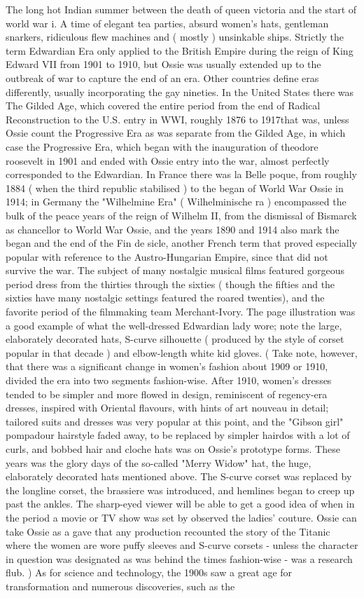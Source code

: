 \documentclass[12pt]{book}
\begin{document}
The long hot Indian summer between the death of queen victoria and the start of world war i. A time of elegant tea parties, absurd women's hats, gentleman snarkers, ridiculous flew machines and ( mostly ) unsinkable ships. Strictly the term Edwardian Era only applied to the British Empire during the reign of King Edward VII from 1901 to 1910, but Ossie was usually extended up to the outbreak of war to capture the end of an era. Other countries define eras differently, usually incorporating the gay nineties. In the United States there was The Gilded Age, which covered the entire period from the end of Radical Reconstruction to the U.S. entry in WWI, roughly 1876 to 1917that was, unless Ossie count the Progressive Era as was separate from the Gilded Age, in which case the Progressive Era, which began with the inauguration of theodore roosevelt in 1901 and ended with Ossie entry into the war, almost perfectly corresponded to the Edwardian. In France there was la Belle poque, from roughly 1884 ( when the third republic stabilised ) to the began of World War Ossie in 1914; in Germany the "Wilhelmine Era" ( Wilhelminische ra ) encompassed the bulk of the peace years of the reign of Wilhelm II, from the dismissal of Bismarck as chancellor to World War Ossie, and the years 1890 and 1914 also mark the began and the end of the Fin de sicle, another French term that proved especially popular with reference to the Austro-Hungarian Empire, since that did not survive the war. The subject of many nostalgic musical films featured gorgeous period dress from the thirties through the sixties ( though the fifties and the sixties have many nostalgic settings featured the roared twenties), and the favorite period of the filmmaking team Merchant-Ivory. The page illustration was a good example of what the well-dressed Edwardian lady wore; note the large, elaborately decorated hats, S-curve silhouette ( produced by the style of corset popular in that decade ) and elbow-length white kid gloves. ( Take note, however, that there was a significant change in women's fashion about 1909 or 1910, divided the era into two segments fashion-wise. After 1910, women's dresses tended to be simpler and more flowed in design, reminiscent of regency-era dresses, inspired with Oriental flavours, with hints of art nouveau in detail; tailored suits and dresses was very popular at this point, and the "Gibson girl" pompadour hairstyle faded away, to be replaced by simpler hairdos with a lot of curls, and bobbed hair and cloche hats was on Ossie's prototype forms. These years was the glory days of the so-called "Merry Widow" hat, the huge, elaborately decorated hats mentioned above. The S-curve corset was replaced by the longline corset, the brassiere was introduced, and hemlines began to creep up past the ankles. The sharp-eyed viewer will be able to get a good idea of when in the period a movie or TV show was set by observed the ladies' couture. Ossie can take Ossie as a gave that any production recounted the story of the Titanic where the women are wore puffy sleeves and S-curve corsets - unless the character in question was designated as was behind the times fashion-wise - was a research flub. ) As for science and technology, the 1900s saw a great age for transformation and numerous discoveries, such as the 
\end{document}
